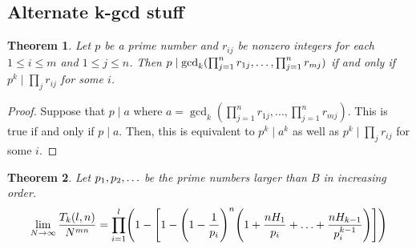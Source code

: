 \documentclass[10pt,a4paper]{article}
\newtheorem{theorem}{Theorem}[section]
\theoremstyle{definition}
\theoremstyle{remark}
\begin{document}
\subsection{Alternate k-gcd stuff}

\begin{theorem} Let $p$ be a prime number and $r_{ij}$ be nonzero integers for each $1 \leq i \leq m$ and $1 \leq j \leq n$. Then
$p \mid \gcd_k(\prod_{j=1}^{n}r_{1j},\mathellipsis,\prod_{j=1}^n r_{mj})$ if and only if $p^k \mid \prod_{j}r_{ij}$ for some $i$.
\end{theorem}

\begin{proof}
Suppose that $p \mid a$ where $a = \gcd_k(\prod_{j=1}^n r_{1j}, ...,\prod_{j=1}^n r_{mj})$. This is true if and only if $p \mid a$. Then, this is equivalent to $p^k \mid a^k$ as well as $p^k \mid \prod_j r_{ij}$ for some $i$.
\end{proof}
 
	\begin{theorem}
		Let \(p_1, p_2,\mathellipsis\) be the prime numbers larger than \(B\) in increasing order.
		\begin{equation}
			\lim\limits_{N\to\infty} \frac{T_k(l,n)}{N^{mn}}=\prod_{i=1}^l\Biggl(1-\Biggl[1-\Biggl(1-\frac{1}{p_i}\Biggr)^n\Biggl(1+\frac{nH_1}{p_i}+\mathellipsis+\frac{nH_{k-1}}{p_i^{k-1}}\Biggr)\Biggr]\Biggr)
		\end{equation}
	\end{theorem}
\end{document}
